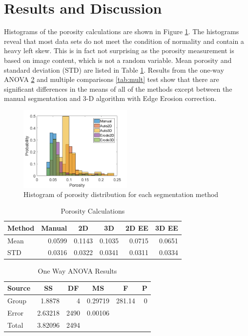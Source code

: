 \documentclass[11pt, twocolumn]{article}
\begin{document}
\section{Results and Discussion} \label{RandD}
Histograms of the porosity calculations are shown in Figure \ref{fig:DataHist}. The histograms reveal that most data sets do not meet the condition of normality and contain a heavy left skew. This is in fact not surprising as the porosity measurement is based on image content, which is not a random variable. Mean porosity and standard deviation (STD) are listed in Table \ref{tab:DataTable}. Results from the one-way ANOVA \ref{tab:OneWay} and multiple comparisons \ref{tab:mult} test show that there are significant differences in the means of all of the methods except between the manual segmentation and 3-D algorithm with Edge Erosion correction. 

\begin{figure}[H]
	\centering
	\includegraphics[width=0.5\textwidth]{DataHistograms.png}
	\caption{Histogram of porosity distribution for each segmentation method}
	\label{fig:DataHist}
\end{figure}
\begin{table}[htbp]
	\centering
	\caption{Porosity Calculations}
	\begin{tabular}{|l|r|r|r|r|r|}
		\toprule
		Method & \multicolumn{1}{c|}{Manual} & \multicolumn{1}{c|}{2D} & \multicolumn{1}{c|}{3D} & \multicolumn{1}{c|}{2D EE} & \multicolumn{1}{c|}{3D EE} \\
		\midrule
		Mean  & 0.0599 & 0.1143 & 0.1035 & 0.0715 & 0.0651 \\
		\midrule
		STD   & 0.0316 & 0.0322 & 0.0341 & 0.0311 & 0.0334 \\
		\bottomrule
	\end{tabular}%
	\label{tab:DataTable}%
\end{table}%
\begin{table}[htbp]
	\centering
	\caption{One Way ANOVA Results}
	\begin{tabular}{|lrrrrr|}
		\toprule
		\multicolumn{1}{|c}{Source} & \multicolumn{1}{c}{SS} & \multicolumn{1}{c}{DF} & \multicolumn{1}{c}{MS} & \multicolumn{1}{c}{F} & \multicolumn{1}{c|}{P } \\
		\midrule
		Group & 1.8878 & 4     & 0.29719 & 281.14 & 0 \\
		Error & 2.63218 & 2490  & 0.00106 &       &  \\
		Total & 3.82096 & 2494  &       &       &  \\
		\bottomrule
	\end{tabular}%
	\label{tab:OneWay}%
\end{table}%
\end{document}
